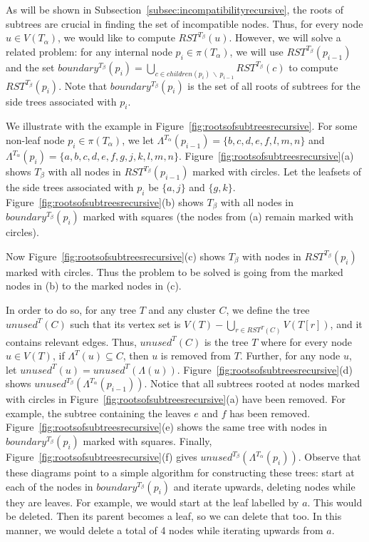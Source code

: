 \documentclass{article}
\newcommand{\leafset}{\Lambda}
\newcommand{\TA}{T_\alpha}
\newcommand{\TB}{T_\beta}
\begin{document}
    As will be shown in Subsection~\ref{subsec:incompatibilityrecursive}, the roots of subtrees are crucial in finding the set of incompatible nodes. Thus, for every node $u \in V(\TA)$, we would like to compute $RST^{\TB}(u)$. However, we will solve a related problem: for any internal node $p_i \in \pi(\TA)$, we will use $RST^{\TB}(p_{i-1})$ and the set $boundary^{\TB}(p_i) = \bigcup_{c \in children(p_i)\, \backslash\, p_{i-1}} RST^{\TB}(c)$ to compute $RST^{\TB}(p_i)$. Note that $boundary^{\TB}(p_i)$ is the set of all roots of subtrees for the side trees associated with $p_i$.

    We illustrate with the example in Figure~\ref{fig:rootsofsubtreesrecursive}. For some non-leaf node $p_i \in \pi(\TA)$, we let $\leafset^{\TA}(p_{i-1}) = \{b, c, d, e, f, l, m, n\}$ and $\leafset^{\TA}(p_i) = \{a, b, c, d, e, f, g, j, k, l, m, n\}$. Figure~\ref{fig:rootsofsubtreesrecursive}(a) shows $\TB$ with all nodes in $RST^{\TB}(p_{i-1})$ marked with circles. Let the leafsets of the side trees associated with $p_i$ be $\{a, j\}$ and $\{g, k\}$. Figure~\ref{fig:rootsofsubtreesrecursive}(b) shows $\TB$ with all nodes in $boundary^{\TB}(p_i)$ marked with squares (the nodes from (a) remain marked with circles).

    Now Figure~\ref{fig:rootsofsubtreesrecursive}(c) shows $\TB$ with nodes in $RST^{\TB}(p_i)$ marked with circles. Thus the problem to be solved is going from the marked nodes in (b) to the marked nodes in (c).

    In order to do so, for any tree $T$ and any cluster $C$, we define the tree $unused^T(C)$ such that its vertex set is $V(T) - \bigcup_{r \in RST^T(C)} V(T[r])$, and it contains relevant edges. Thus, $unused^T(C)$ is the tree $T$ where for every node $u \in V(T)$, if $\leafset^T(u) \subseteq C$, then $u$ is removed from $T$. Further, for any node $u$, let $unused^T(u) = unused^T(\leafset(u))$. Figure~\ref{fig:rootsofsubtreesrecursive}(d) shows $unused^{\TB}(\leafset^{\TA}(p_{i-1}))$. Notice that all subtrees rooted at nodes marked with circles in Figure~\ref{fig:rootsofsubtreesrecursive}(a) have been removed. For example, the subtree containing the leaves $e$ and $f$ has been removed. Figure~\ref{fig:rootsofsubtreesrecursive}(e) shows the same tree with nodes in $boundary^{\TB}(p_i)$ marked with squares. Finally, Figure~\ref{fig:rootsofsubtreesrecursive}(f) gives $unused^{\TB}(\leafset^{\TA}(p_i))$. Observe that these diagrams point to a simple algorithm for constructing these trees: start at each of the nodes in $boundary^{\TB}(p_i)$ and iterate upwards, deleting nodes while they are leaves. For example, we would start at the leaf labelled by $a$. This would be deleted. Then its parent becomes a leaf, so we can delete that too. In this manner, we would delete a total of 4 nodes while iterating upwards from $a$.
\end{document}
